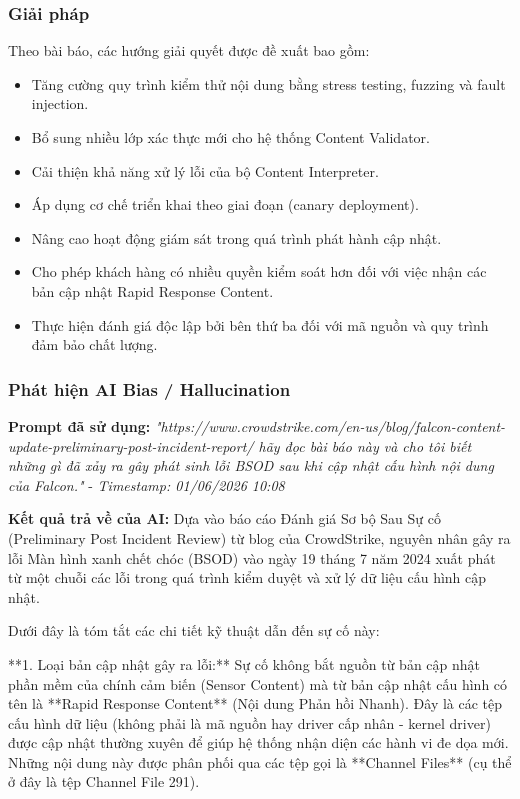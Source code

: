 \subsubsection{Giải pháp}
Theo bài báo, các hướng giải quyết được đề xuất bao gồm:
\begin{itemize}
    \item Tăng cường quy trình kiểm thử nội dung bằng stress testing, fuzzing và fault injection.
    \item Bổ sung nhiều lớp xác thực mới cho hệ thống Content Validator.
    \item Cải thiện khả năng xử lý lỗi của bộ Content Interpreter.
    \item Áp dụng cơ chế triển khai theo giai đoạn (canary deployment).
    \item Nâng cao hoạt động giám sát trong quá trình phát hành cập nhật.
    \item Cho phép khách hàng có nhiều quyền kiểm soát hơn đối với việc nhận các bản cập nhật Rapid Response Content.
    \item Thực hiện đánh giá độc lập bởi bên thứ ba đối với mã nguồn và quy trình đảm bảo chất lượng.
\end{itemize}

\subsubsection{Phát hiện AI Bias / Hallucination}
\textbf{Prompt đã sử dụng:} \textit{"{https://www.crowdstrike.com/en-us/blog/falcon-content-update-preliminary-post-incident-report/} hãy đọc bài báo này và cho tôi biết những gì đã xảy ra gây phát sinh lỗi BSOD sau khi cập nhật cấu hình nội dung của Falcon."} - \textit{Timestamp: 01/06/2026 10:08}

\textbf{Kết quả trả về của AI:}
Dựa vào báo cáo Đánh giá Sơ bộ Sau Sự cố (Preliminary Post Incident Review) từ blog của CrowdStrike, nguyên nhân gây ra lỗi Màn hình xanh chết chóc (BSOD) vào ngày 19 tháng 7 năm 2024 xuất phát từ một chuỗi các lỗi trong quá trình kiểm duyệt và xử lý dữ liệu cấu hình cập nhật.

Dưới đây là tóm tắt các chi tiết kỹ thuật dẫn đến sự cố này:

**1. Loại bản cập nhật gây ra lỗi:**
Sự cố không bắt nguồn từ bản cập nhật phần mềm của chính cảm biến (Sensor Content) mà từ bản cập nhật cấu hình có tên là **Rapid Response Content** (Nội dung Phản hồi Nhanh). Đây là các tệp cấu hình dữ liệu (không phải là mã nguồn hay driver cấp nhân - kernel driver) được cập nhật thường xuyên để giúp hệ thống nhận diện các hành vi đe dọa mới. Những nội dung này được phân phối qua các tệp gọi là **Channel Files** (cụ thể ở đây là tệp Channel File 291).

